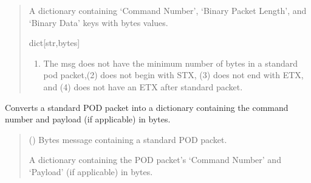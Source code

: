 \documentclass[letterpaper,10pt,english]{sphinxmanual}
\begin{document}
\begin{fulllineitems}
\begin{fulllineitems}
\begin{quote}
\begin{description}
\sphinxAtStartPar
A dictionary containing ‘Command Number’, ‘Binary Packet Length’,                 and ‘Binary Data’ keys with bytes values.

\sphinxAtStartPar
dict{[}str,bytes{]}

\sphinxAtStartPar
{} \textendash{} \begin{enumerate}
%
\item {} 
\sphinxAtStartPar
The msg does not have the minimum number of bytes in a standard pod                 packet,(2) does not begin with STX, (3) does not end with ETX, and (4) does                 not have an ETX after standard packet.

\end{enumerate}


\end{description}\end{quote}

\end{fulllineitems}


\begin{fulllineitems}
\label{\detokenize{BasicPodProtocol:BasicPodProtocol.POD_Basics.UnpackPODpacket_Standard}}
\pysigstartsignatures
{}
\pysigstopsignatures
\sphinxAtStartPar
Converts a standard POD packet into a dictionary containing the command number and payload
(if applicable) in bytes.
\begin{quote}\begin{description}
\sphinxAtStartPar
{} () \textendash{} Bytes message containing a standard POD packet.

\sphinxAtStartPar
A dictionary containing the POD packet’s ‘Command Number’ and ‘Payload’                 (if applicable) in bytes.


\end{description}
\end{quote}
\end{fulllineitems}
\end{fulllineitems}
\end{document}
